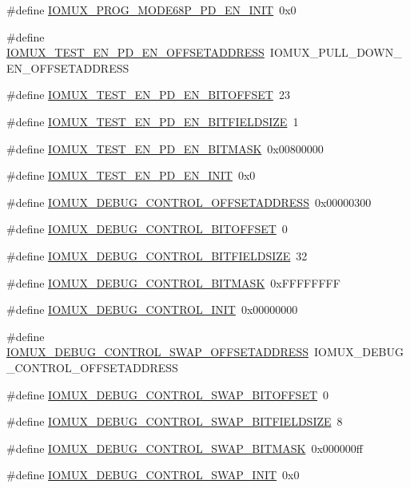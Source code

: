 \begin{DoxyCompactItemize}
\#define \hyperlink{a00560_a873cd96c60bce076b7864c69104cd3fa}{IOMUX\_\-PROG\_\-MODE68P\_\-PD\_\-EN\_\-INIT}~0x0
\item 
\#define \hyperlink{a00560_ae96ea975de9127e592034663213eb00d}{IOMUX\_\-TEST\_\-EN\_\-PD\_\-EN\_\-OFFSETADDRESS}~IOMUX\_\-PULL\_\-DOWN\_\-EN\_\-OFFSETADDRESS
\item 
\#define \hyperlink{a00560_a4006b253a40aa4e29348368e95fd9af8}{IOMUX\_\-TEST\_\-EN\_\-PD\_\-EN\_\-BITOFFSET}~23
\item 
\#define \hyperlink{a00560_ad0f34f9b4403bb31a23c62ae8934ba79}{IOMUX\_\-TEST\_\-EN\_\-PD\_\-EN\_\-BITFIELDSIZE}~1
\item 
\#define \hyperlink{a00560_a52f796507cb7b520c9414a3ac227dea7}{IOMUX\_\-TEST\_\-EN\_\-PD\_\-EN\_\-BITMASK}~0x00800000
\item 
\#define \hyperlink{a00560_a7103f3c7c5ccaa37676a8fc909a93cd2}{IOMUX\_\-TEST\_\-EN\_\-PD\_\-EN\_\-INIT}~0x0
\item 
\#define \hyperlink{a00560_ac044c13599edfc1bf0c5837713a293b0}{IOMUX\_\-DEBUG\_\-CONTROL\_\-OFFSETADDRESS}~0x00000300
\item 
\#define \hyperlink{a00560_a2ccb900fcfaa191a7476be3482770a6e}{IOMUX\_\-DEBUG\_\-CONTROL\_\-BITOFFSET}~0
\item 
\#define \hyperlink{a00560_aab88dbbdd90172cfe90d0e98a4ed1cb7}{IOMUX\_\-DEBUG\_\-CONTROL\_\-BITFIELDSIZE}~32
\item 
\#define \hyperlink{a00560_ad61ca29df44c1160914e6485a9e4d245}{IOMUX\_\-DEBUG\_\-CONTROL\_\-BITMASK}~0xFFFFFFFF
\item 
\#define \hyperlink{a00560_a013396b06e323035b16743f975828db1}{IOMUX\_\-DEBUG\_\-CONTROL\_\-INIT}~0x00000000
\item 
\#define \hyperlink{a00560_a672422177f1ae9c8ddac3bc9590e2408}{IOMUX\_\-DEBUG\_\-CONTROL\_\-SWAP\_\-OFFSETADDRESS}~IOMUX\_\-DEBUG\_\-CONTROL\_\-OFFSETADDRESS
\item 
\#define \hyperlink{a00560_a364c9c0737f8747ab418a54623e6d88e}{IOMUX\_\-DEBUG\_\-CONTROL\_\-SWAP\_\-BITOFFSET}~0
\item 
\#define \hyperlink{a00560_a2fcd0cbc3cd8762eeb00770ff2038e59}{IOMUX\_\-DEBUG\_\-CONTROL\_\-SWAP\_\-BITFIELDSIZE}~8
\item 
\#define \hyperlink{a00560_a0a4d929a06203a4ff75fc0d1f6d2c065}{IOMUX\_\-DEBUG\_\-CONTROL\_\-SWAP\_\-BITMASK}~0x000000ff
\item 
\#define \hyperlink{a00560_acd3f6cd45c8a5e314c989252c79c5946}{IOMUX\_\-DEBUG\_\-CONTROL\_\-SWAP\_\-INIT}~0x0
\item 

\end{DoxyCompactItemize}

